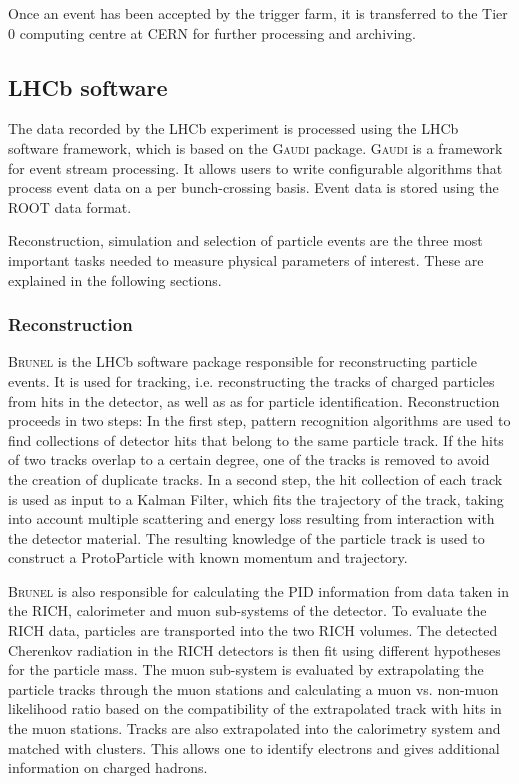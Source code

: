 Once an event has been accepted by the trigger farm, it is transferred to the Tier 0 computing centre at \gls{CERN} for further processing and archiving.

\subsection{LHCb software}

The data recorded by the LHCb experiment is processed using the LHCb software framework, which is based on the \textsc{Gaudi} package.
\textsc{Gaudi} is a framework for event stream processing.
It allows users to write configurable algorithms that process event data on a per bunch-crossing basis.
Event data is stored using the \textsc{ROOT}\cite{ROOT} data format.

Reconstruction, simulation and selection of particle events are the three most important tasks needed to measure physical parameters of interest.
These are explained in the following sections.

\subsubsection{Reconstruction}

\textsc{Brunel} is the LHCb software package responsible for reconstructing particle events.
It is used for tracking, i.e. reconstructing the tracks of charged particles from hits in the detector, as well as as for particle identification.
Reconstruction proceeds in two steps:
In the first step, pattern recognition algorithms are used to find collections of detector hits that belong to the same particle track.
If the hits of two tracks overlap to a certain degree, one of the tracks is removed to avoid the creation of duplicate tracks.
In a second step, the hit collection of each track is used as input to a Kalman Filter, which fits the trajectory of the track, taking into account multiple scattering and energy loss resulting from interaction with the detector material.
The resulting knowledge of the particle track is used to construct a ProtoParticle with known momentum and trajectory.

\textsc{Brunel} is also responsible for calculating the PID information from data taken in the RICH, calorimeter and muon sub-systems of the detector.
To evaluate the RICH data, particles are transported into the two RICH volumes.
The detected Cherenkov radiation in the RICH detectors is then fit using different hypotheses for the particle mass.
The muon sub-system is evaluated by extrapolating the particle tracks through the muon stations and calculating a muon vs. non-muon likelihood ratio based on the compatibility of the extrapolated track with hits in the muon stations.
Tracks are also extrapolated into the calorimetry system and matched with clusters.
This allows one to identify electrons and gives additional information on charged hadrons.

